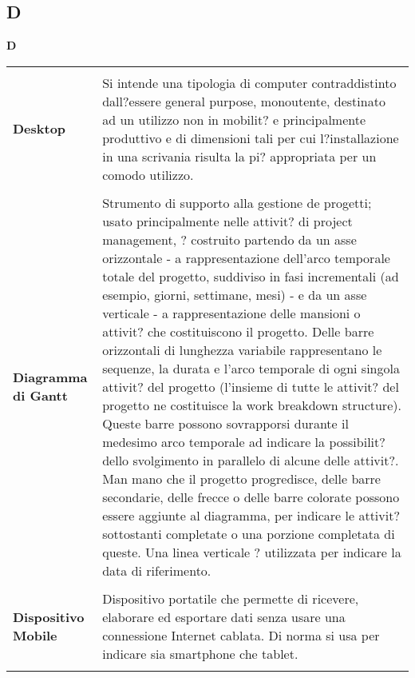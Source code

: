 {\subsection{D} 
\hfill\Huge{\textbf{D}} \\ 
\normalsize 
\begin{longtabu} to 
\toprule \\ 
\textbf{Desktop} & Si intende una tipologia di computer contraddistinto dall?essere general purpose, monoutente, destinato ad un utilizzo non in mobilit? e principalmente produttivo e di dimensioni tali per cui l?installazione in una scrivania risulta la pi? appropriata per un comodo utilizzo. \\ 
 \\ 
\textbf{Diagramma di Gantt} & Strumento di supporto alla gestione de progetti; usato principalmente nelle attivit? di project management, ? costruito partendo da un asse orizzontale - a rappresentazione dell'arco temporale totale del progetto, suddiviso in fasi incrementali (ad esempio, giorni, settimane, mesi) - e da un asse verticale - a rappresentazione delle mansioni o attivit? che costituiscono il progetto. Delle barre orizzontali di lunghezza variabile rappresentano le sequenze, la durata e l'arco temporale di ogni singola attivit? del progetto (l'insieme di tutte le attivit? del progetto ne costituisce la work breakdown structure). Queste barre possono sovrapporsi durante il medesimo arco temporale ad indicare la possibilit? dello svolgimento in parallelo di alcune delle attivit?. Man mano che il progetto progredisce, delle barre secondarie, delle frecce o delle barre colorate possono essere aggiunte al diagramma, per indicare le attivit? sottostanti completate o una porzione completata di queste. Una linea verticale ? utilizzata per indicare la data di riferimento. \\ 
 \\ 
\textbf{Dispositivo Mobile} & Dispositivo portatile che permette di ricevere, elaborare ed esportare dati senza usare una connessione Internet cablata. Di norma si usa per indicare sia smartphone che tablet. \\ 
 \\ 
\end{longtabu} 
\newpage 
}
